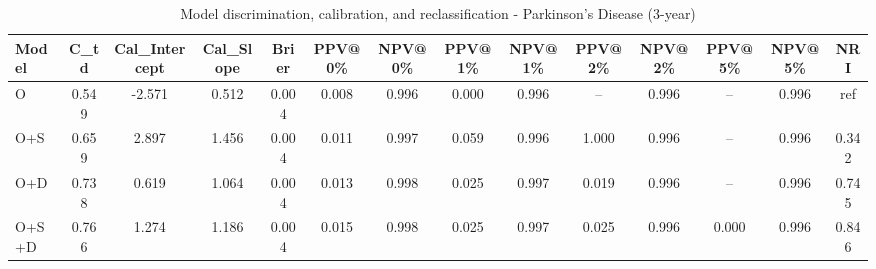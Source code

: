 \begin{table}[htbp]
\centering
\small
\caption{Model discrimination, calibration, and reclassification - Parkinson's Disease (3-year)}
\label{tab:perf_pd_3y}
\begin{tabular}{lccccccccccccc}
\toprule
Model & C\_td & Cal\_Intercept & Cal\_Slope & Brier & PPV@0\% & NPV@0\% & PPV@1\% & NPV@1\% & PPV@2\% & NPV@2\% & PPV@5\% & NPV@5\% & NRI \\
\midrule
O & 0.549 & -2.571 & 0.512 & 0.004 & 0.008 & 0.996 & 0.000 & 0.996 & -- & 0.996 & -- & 0.996 & ref \\
O+S & 0.659 & 2.897 & 1.456 & 0.004 & 0.011 & 0.997 & 0.059 & 0.996 & 1.000 & 0.996 & -- & 0.996 & 0.342 \\
O+D & 0.738 & 0.619 & 1.064 & 0.004 & 0.013 & 0.998 & 0.025 & 0.997 & 0.019 & 0.996 & -- & 0.996 & 0.745 \\
O+S+D & 0.766 & 1.274 & 1.186 & 0.004 & 0.015 & 0.998 & 0.025 & 0.997 & 0.025 & 0.996 & 0.000 & 0.996 & 0.846 \\
\bottomrule
\end{tabular}
\end{table}